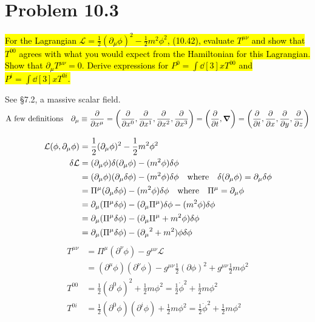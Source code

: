 \documentclass{article}
\begin{document}
\section*{Problem 10.3}
\begin{quoting}
  \hl{For the Lagrangian $\mathcal{L}=\frac{1}{2}(\partial_\mu \phi)^2-\frac{1}{2}m^2\phi^2$, (10.42), evaluate $T^{\mu\nu}$ and show that $T^{00}$ agrees with what you would expect from the Hamiltonian for this Lagrangian. Show that $\partial_\mu T^{\mu\nu}=0$. Derive expressions for $P^0=\int\dd[3]{x}T^{00}$ and $P^i=\int\dd[3]{x}T^{0i}$.}
\end{quoting}
See \S 7.2, a massive scalar field.
\begin{align*}
  \qq*{A few definitions}\partial_\mu\equiv\pdv{x^\mu}=\pqty{\pdv{x^0},\pdv{x^1},\pdv{x^2},\pdv{x^3}}=\pqty{\pdv{t},\grad}=\pqty{\pdv{t},\pdv{x},\pdv{y},\pdv{z}}
\end{align*}

\begin{align*}
  \mathcal{L}(\phi,\partial_\mu \phi) & =\frac{1}{2}(\partial_\mu \phi)^2-\frac{1}{2}m^2\phi^2                                                                        \\
  \delta\mathcal{L}                   & =(\partial_\mu \phi)\delta(\partial_\mu \phi)-(m^2 \phi)\delta\phi                                                            \\
                                      & =(\partial_\mu \phi)(\partial_\mu \delta\phi)-(m^2 \phi)\delta\phi\qq{where}\delta(\partial_\mu \phi)=\partial_\mu \delta\phi \\
                                      & =\Pi^\mu(\partial_\mu \delta\phi)-(m^2 \phi)\delta\phi\qq{where}\Pi^\mu=\partial_\mu \phi                                     \\
                                      & =\partial_\mu (\Pi^\mu \delta\phi)-(\partial_\mu \Pi^\mu) \delta\phi-(m^2 \phi)\delta\phi                                     \\
                                      & =\partial_\mu (\Pi^\mu \delta\phi)-(\partial_\mu \Pi^\mu+m^2 \phi)\delta\phi                                                  \\
                                      & =    \partial_\mu (\Pi^\mu \delta\phi)-({\partial_\mu}^2 +m^2 )\phi\delta\phi                                                 \\
\end{align*}
\begin{align*}
  T^{\mu\nu} & = \Pi^\mu (\partial^\nu \phi)-g^{\mu\nu}\mathcal{L}                                                           \\
             & = (\partial^\mu \phi) (\partial^\nu \phi)-g^{\mu\nu}\frac{1}{2}(\partial \phi)^2+g^{\mu\nu}\frac{1}{2}m\phi^2 \\
  T^{00}     & =\frac{1}{2}(\partial^0 \phi)^2+\frac{1}{2}m\phi^2=\frac{1}{2}\dot{ \phi}^2+\frac{1}{2}m\phi^2                \\
  T^{0i}     & =\frac{1}{2}(\partial^0 \phi)(\partial^i \phi)+\frac{1}{2}m\phi^2=\frac{1}{2}\dot{ \phi}^2+\frac{1}{2}m\phi^2 \\
\end{align*}
\end{document}
